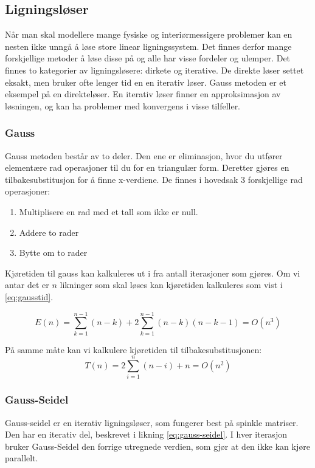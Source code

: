 \documentclass[10pt,a4paper, norsk]{article}
\begin{document}
\subsection{Ligningsløser}
Når man skal modellere mange fysiske og interiørmessigere problemer kan en nesten ikke unngå å løse store linear ligningssystem. Det finnes derfor mange forskjellige metoder å løse disse på og alle har visse fordeler og ulemper.
Det finnes to kategorier av ligningsløsere: dirkete og iterative. De direkte løser settet eksakt, men bruker ofte lenger tid en en iterativ løser. Gauss metoden er et eksempel på en direkteløser. En iterativ løser finner en approksimasjon av løsningen, og kan ha problemer med konvergens i visse tilfeller. 

\subsubsection{Gauss}

Gauss metoden består av to deler. Den ene er eliminasjon, hvor du utfører elementære rad operasjoner til du for en triangulær form. Deretter gjøres en tilbakesubstitusjon for å finne x-verdiene. De finnes i hovedsak 3 forskjellige rad operasjoner:
\begin{enumerate}
\item Multiplisere en rad med et tall som ikke er null.
\item Addere to rader
\item Bytte om to rader
\end{enumerate}

Kjøretiden til gauss kan kalkuleres ut i fra antall iterasjoner som gjøres. Om vi antar det er $n$ likninger som skal løses kan kjøretiden kalkuleres som vist i \eqref{eq:gausstid}.

\begin{equation} \label{eq:gausstid}
E(n) = \sum_{k=1}^{n-1} (n-k) + 2 \sum_{k=1}^{n-1} (n-k)(n-k-1) = O(n^3)
\end{equation}

På samme måte kan vi kalkulere kjøretiden til tilbakesubstitusjonen:
\begin{equation} \label{eq:gaussseideltid}
T(n) = 2\sum_{i=1}^{n} (n-i) + n = O(n^2)
\end{equation}


\subsubsection{Gauss-Seidel}
Gauss-seidel er en iterativ ligningsløser, som fungerer best på spinkle matriser. Den har en iterativ del, beskrevet i likning \ref{eq:gauss-seidel}. I hver iterasjon bruker Gauss-Seidel  den forrige utregnede verdien, som gjør at den ikke kan kjøre parallelt. 
 
\end{document}
